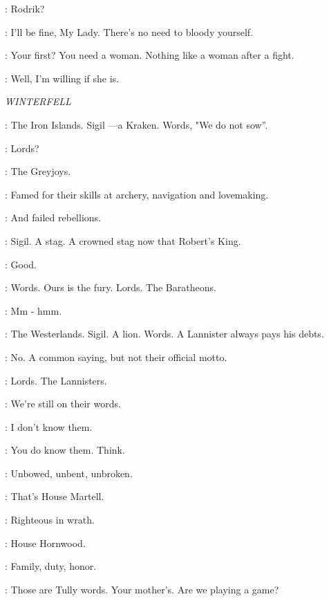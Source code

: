 \CATELYN: Rodrik? 

\RODRIK: I'll be fine, My Lady. There's no need to bloody yourself. 


\BRONN: Your first? You need a woman. Nothing like a woman after a fight. 

\TYRION:  Well, I'm willing if she is. 


\scene

\textit{WINTERFELL} 


\BRAN: The Iron Islands. Sigil ---a Kraken. Words, "We do not sow''. 

\LUWIN: Lords? 

\BRAN: The Greyjoys. 

\THEON: Famed for their skills at archery, navigation and lovemaking. 

\LUWIN: And failed rebellions. 


\BRAN: Sigil. A stag. A crowned stag now that Robert's King. 

\LUWIN: Good. 

\BRAN: Words. Ours is the fury. Lords. The Baratheons. 

\LUWIN: Mm - hmm. 

\BRAN: The Westerlands. Sigil. A lion. Words. A Lannister always pays his debts. 

\LUWIN: No. A common saying, but not their official motto. 

\BRAN: Lords. The Lannisters. 

\LUWIN: We're still on their words. 

\BRAN: I don't know them. 

\LUWIN: You do know them. Think. 

\BRAN: Unbowed, unbent, unbroken. 

\LUWIN: That's House Martell. 

\BRAN: Righteous in wrath. 

\LUWIN: House Hornwood. 

\BRAN: Family, duty, honor. 

\LUWIN: Those are Tully words. Your mother's. Are we playing a game? 

